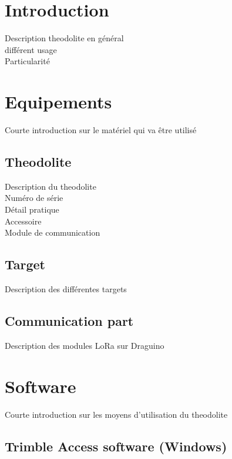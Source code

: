 \documentclass[10pt,letterpaper,oneside]{article}
\begin{document}
\makeCustomTitle
\thispagestyle{titlePage}

\section{Introduction}

Description theodolite en général \\
différent usage \\
Particularité \\

\section{Equipements}

Courte introduction sur le matériel qui va être utilisé

\subsection{Theodolite}

Description du theodolite \\
Numéro de série \\
Détail pratique \\
Accessoire \\
Module de communication \\

\subsection{Target}

Description des différentes targets

\subsection{Communication part}

Description des modules LoRa sur Draguino

\section{Software}

Courte introduction sur les moyens d'utilisation du theodolite

\subsection{Trimble Access software (Windows)}
\end{document}
